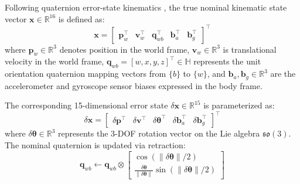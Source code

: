 \documentclass[lettersize,journal]{IEEEtran}
\begin{document}
Following quaternion error-state kinematics \cite{sola2017quaternion}, the true nominal kinematic state vector $\mathbf{x} \in \mathbb{R}^{16}$ is defined as:
\begin{equation}
\mathbf{x} = \begin{bmatrix} \mathbf{p}_w^\top & \mathbf{v}_w^\top & \mathbf{q}_{wb}^\top & \mathbf{b}_a^\top & \mathbf{b}_g^\top \end{bmatrix}^\top
\end{equation}
where $\mathbf{p}_w \in \mathbb{R}^3$ denotes position in the world frame, $\mathbf{v}_w \in \mathbb{R}^3$ is translational velocity in the world frame, $\mathbf{q}_{wb} = [w, x, y, z]^\top \in \mathbb{H}$ represents the unit orientation quaternion mapping vectors from $\{b\}$ to $\{w\}$, and $\mathbf{b}_a, \mathbf{b}_g \in \mathbb{R}^3$ are the accelerometer and gyroscope sensor biases expressed in the body frame.

The corresponding 15-dimensional error state $\delta \mathbf{x} \in \mathbb{R}^{15}$ is parameterized as:
\begin{equation}
\delta \mathbf{x} = \begin{bmatrix} \delta \mathbf{p}^\top & \delta \mathbf{v}^\top & \delta \boldsymbol{\theta}^\top & \delta \mathbf{b}_a^\top & \delta \mathbf{b}_g^\top \end{bmatrix}^\top
\end{equation}
where $\delta \boldsymbol{\theta} \in \mathbb{R}^3$ represents the 3-DOF rotation vector on the Lie algebra $\mathfrak{so}(3)$. 
The nominal quaternion is updated via retraction:
\begin{equation}
\mathbf{q}_{wb} \leftarrow \mathbf{q}_{wb} \otimes \begin{bmatrix} \cos(\|\delta \boldsymbol{\theta}\|/2) \\ \frac{\delta \boldsymbol{\theta}}{\|\delta \boldsymbol{\theta}\|} \sin(\|\delta \boldsymbol{\theta}\|/2) \end{bmatrix}
\end{equation}
\end{document}
